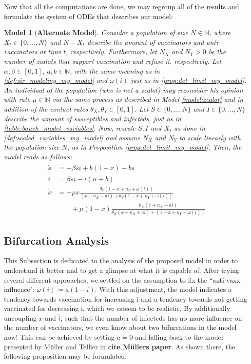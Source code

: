\documentclass[12pt,a4paper,twoside]{article}
\newtheorem{model}{Model}[section]
\begin{document}
Now that all the computations are done, we may regroup all of the results and formulate the system of \acp{ODE} that describes our model:
\begin{model}[\textbf{Alternate Model}]\label{model:my_model}
Consider a population of size $N \in \mathbb{N}$, where $X_t \in \lbrace 0,\dots,N\rbrace$ and $N-X_t$ describe the amount of vaccinators and anti-vaccinators at time $t$, respectively. Furthermore, let $N_X$ and $N_Y > 0$ be the number of zealots that support vaccination and refuse it, respectively. Let $\alpha,\beta \in \left[0,1\right]$, $a,b \in \mathbb{N}$, with the same meaning as in \eqref{def:sir_modeling_my_model} and $\omega\left(i\right)$ just as in \eqref{prop:det_limit_my_model}. An individual of the population (who is not a zealot) may reconsider his opinion with rate $\mu \in \mathbb{N}$ via the same process as described in Model \ref{model:zealot} and in addition of the contact rates $\theta_X, \theta_Y \in \left[0,1\right]$. Let $S \in \lbrace 0,\dots,N\rbrace$ and $I \in  \lbrace 0,\dots,N\rbrace$ describe the amount of susceptibles and infecteds, just as in \eqref{table:bauch_model_variables}. Now, rescale $S,I$ and $X_t$ as done in \eqref{def:scaled_variables_my_model} and assume $N_X$ and $N_Y$ to scale linearly with the population size $N$, as in Proposition \ref{prop:det_limit_my_model}. Then, the model reads as follows:
	\begin{align}
	\begin{split}
	\dot{s} &= -\beta si + b\left(1-x\right) - bs\\
	\dot{i} &= \beta si - i\left(\alpha + b\right)\\
	\dot{x} &= -\mu x\frac{\theta_Y(1-x+n_Y+\omega\left(i\right))}{(x+n_X+ai) + \theta_Y(1-x+n_Y+\omega\left(i\right))}\\
	&\qquad+ \mu \left(1-x\right)\frac{\theta_X (x+ n_X+ ai)}{\theta_X (x + n_X + ai) + (1-x + n_Y + \omega\left(i\right))}
	\end{split}
	\end{align}
\end{model}

\subsection{Bifurcation Analysis}

This Subsection is dedicated to the analysis of the proposed model in order to understand it better and to get a glimpse at what it is capable of. After trying several different approaches, we settled on the assumption to fix the ``anti-vaxx influence": $\omega\left(i\right) \coloneqq a\left(1-i\right)$. With this adjustment, the model indicates a tendency towards vaccination for increasing i and a tendency towards not getting vaccinated for decreasing i, which we esteem to be realistic. By additionally uncoupling $\dot{x}$ and $\dot{i}$, such that the number of infecteds has no more influence on the number of vaccinators, we even know about two bifurcations in the model now! This can be achieved by setting $a = 0$ and falling back to the model presented by M\"uller and Tellier in \textbf{cite M\"ullers paper}. As shown there, the following proposition may be formulated:
\end{document}
